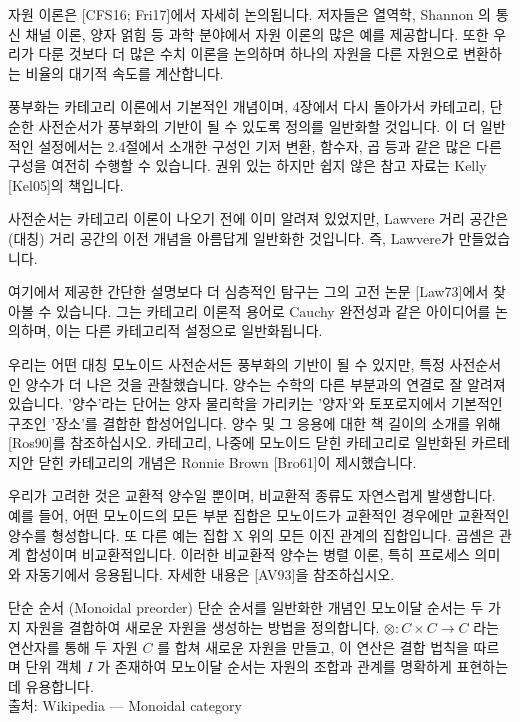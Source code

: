 \documentclass[11pt, a4paper, twoside, openany]{book}
\begin{document}
{\par\medskip
자원 이론은 [CFS16; Fri17]에서 자세히 논의됩니다. 저자들은 열역학, Shannon 의 통신 채널 이론, 양자 얽힘 등 과학 분야에서 자원 이론의 많은 예를 제공합니다. 또한 우리가 다룬 것보다 더 많은 수치 이론을 논의하며 하나의 자원을 다른 자원으로 변환하는 비율의 대기적 속도를 계산합니다.

\par\medskip
풍부화는 카테고리 이론에서 기본적인 개념이며, 4\hspace{0pt}장에서 다시 돌아가서 카테고리, 단순한 사전순서가 풍부화의 기반이 될 수 있도록 정의를 일반화할 것입니다. 이 더 일반적인 설정에서는 2.4\hspace{0pt}절에서 소개한 구성인 기저 변환, 함수자, 곱 등과 같은 많은 다른 구성을 여전히 수행할 수 있습니다. 권위 있는 하지만 쉽지 않은 참고 자료는 Kelly [Kel05]의 책입니다.

\par\medskip
사전순서는 카테고리 이론이 나오기 전에 이미 알려져 있었지만, Lawvere 거리 공간은 (대칭) 거리 공간의 이전 개념을 아름답게 일반화한 것입니다. 즉, Lawvere\hspace{0pt}가 만들었습니다.

\par\medskip
여기에서 제공한 간단한 설명보다 더 심층적인 탐구는 그의 고전 논문 [Law73]에서 찾아볼 수 있습니다. 그는 카테고리 이론적 용어로 Cauchy 완전성과 같은 아이디어를 논의하며, 이는 다른 카테고리적 설정으로 일반화됩니다.

\par\medskip
우리는 어떤 대칭 모노이드 사전순서든 풍부화의 기반이 될 수 있지만, 특정 사전순서인 양수가 더 나은 것을 관찰했습니다. 양수는 수학의 다른 부분과의 연결로 잘 알려져 있습니다. '양수'라는 단어는 양자 물리학을 가리키는 '양자'와 토포로지에서 기본적인 구조인 '장소'를 결합한 합성어입니다. 양수 및 그 응용에 대한 책 길이의 소개를 위해 [Ros90]를 참조하십시오. 카테고리, 나중에 모노이드 닫힌 카테고리로 일반화된 카르테지안 닫힌 카테고리의 개념은 Ronnie Brown [Bro61]이 제시했습니다.

\par\medskip
우리가 고려한 것은 교환적 양수일 뿐이며, 비교환적 종류도 자연스럽게 발생합니다. 예를 들어, 어떤 모노이드의 모든 부분 집합은 모노이드가 교환적인 경우에만 교환적인 양수를 형성합니다. 또 다른 예는 집합 X 위의 모든 이진 관계의 집합입니다. 곱셈은 관계 합성이며 비교환적입니다. 이러한 비교환적 양수는 병렬 이론, 특히 프로세스 의미와 자동기에서 응용됩니다. 자세한 내용은 [AV93]을 참조하십시오.

\begin{deepresearch}{단순 순서 (Monoidal preorder)}
단순 순서를 일반화한 개념인 모노이달 순서는 두 가지 자원을 결합하여 새로운 자원을 생성하는 방법을 정의합니다.  $⊗ : C × C → C$ 라는 연산자를 통해 두 자원 $C$ 를 합쳐 새로운 자원을 만들고, 이 연산은 결합 법칙을 따르며 단위 객체 $I$ 가 존재하여 
모노이달 순서는 자원의 조합과 관계를 명확하게 표현하는 데 유용합니다.
\\[4pt]{\footnotesize\color{ctgray} 출처: Wikipedia — Monoidal category}
\end{deepresearch}

}
\end{document}
